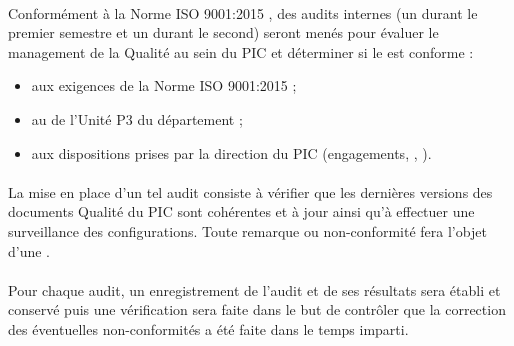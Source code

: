 \paragraph*{} Conformément à la Norme ISO 9001:2015 , des audits internes (un durant le premier semestre et un durant le second) seront menés pour évaluer le management de la Qualité au sein du PIC et déterminer si le \SMQCourt{} est conforme :
\begin{itemize}
\item aux exigences de la Norme ISO 9001:2015 ;
\item au \SMQ{} de l'Unité P3 du département \ASI ;
\item aux dispositions prises par la direction du PIC (engagements, \PQCourt , \PGCCourt).
\end{itemize}
\paragraph*{} La mise en place d'un tel audit consiste à vérifier que les dernières versions des documents
Qualité du PIC sont cohérentes et à jour ainsi qu'à effectuer une surveillance des configurations.
Toute remarque ou non-conformité fera l'objet d'une \FFTCourt .

\paragraph*{} Pour chaque audit, un enregistrement de l'audit et de ses résultats sera établi et conservé
puis une vérification sera faite dans le but de contrôler que la correction des éventuelles non-conformités a été faite dans le temps imparti.

